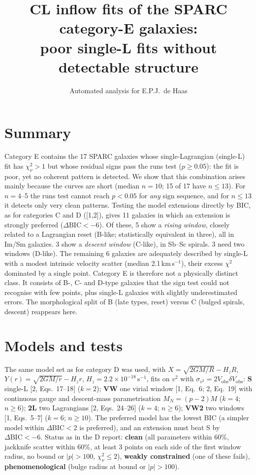 \documentclass[10pt]{article}
\title{\bfseries CL inflow fits of the SPARC category-E galaxies:\\ poor single-L fits without detectable structure}
\author{Automated analysis for E.P.J.\ de Haas}\date{}
\begin{document}
\maketitle
\section*{Summary}
Category E contains the 17 SPARC galaxies whose single-Lagrangian (single-L) fit has $\chi^2_\nu>1$ but whose residual signs pass the runs test ($p\ge0.05$): the fit is poor, yet no coherent pattern is detected. We show that this combination arises mainly because the curves are short (median $n=10$; 15 of 17 have $n\le13$). For $n=4$--5 the runs test cannot reach $p<0.05$ for \emph{any} sign sequence, and for $n\le13$ it detects only very clean patterns. Testing the model extensions directly by BIC, as for categories C and D ([1,2]), gives 11 galaxies in which an extension is strongly preferred ($\Delta\mathrm{BIC}<-6$). Of these, 5 show a \emph{rising window}, closely related to a Lagrangian reset (B-like; statistically equivalent in three), all in Im/Sm galaxies. 3 show a \emph{descent window} (C-like), in Sb--Sc spirals. 3 need two windows (D-like). The remaining 6 galaxies are adequately described by single-L with a modest intrinsic velocity scatter (median 2.1\,km\,s$^{-1}$), their excess $\chi^2$ dominated by a single point. Category E is therefore not a physically distinct class. It consists of B-, C- and D-type galaxies that the sign test could not recognise with few points, plus single-L galaxies with slightly underestimated errors. The morphological split of B (late types, reset) versus C (bulged spirals, descent) reappears here.

\section{Models and tests}
The same model set as for category D was used, with $X=\sqrt{2GM/R}-H_zR$, $Y(r)=\sqrt{2GM/r}-H_zr$, $H_z=2.2\times10^{-18}$\,s$^{-1}$, fits on $v^2$ with $\sigma_{v^2}=2V_\mathrm{obs}\delta V_\mathrm{obs}$:
\textbf{S} single-L [2, Eqs.~17--18] ($k=2$); \textbf{VW} one virial window [1, Eq.~6; 2, Eq.~19] with continuous gauge and descent-mass parametrisation $M_N=(p-2)M$ ($k=4$; $n\ge6$); \textbf{2L} two Lagrangians [2, Eqs.~24--26] ($k=4$; $n\ge6$); \textbf{VW2} two windows [1, Eqs.~5--7] ($k=6$; $n\ge10$). The preferred model has the lowest BIC (a simpler model within $\Delta\mathrm{BIC}<2$ is preferred), and an extension must beat S by $\Delta\mathrm{BIC}<-6$. Status as in the D report: \textbf{clean} (all parameters within 60\%, jackknife scatter within 60\%, at least 3 points on each side of the first window radius, no bound or $|p|>100$, $\chi^2_\nu\le2$), \textbf{weakly constrained} (one of these fails), \textbf{phenomenological} (bulge radius at bound or $|p|>100$).
\end{document}
